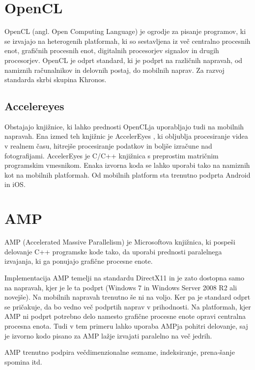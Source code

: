 \section{OpenCL}

OpenCL (angl. Open Computing Language) \cite{opencl} je ogrodje za pisanje programov, ki se izvajajo na heterogenih platformah, ki so sestavljena iz več centralno procesnih enot, grafičnih procesnih enot, digitalnih procesorjev signalov in drugih procesorjev. OpenCL je odprt standard, ki je podprt na različnih napravah, od namiznih računalnikov in delovnih postaj, do mobilnih naprav. Za razvoj standarda skrbi skupina Khronos.

\subsection{Accelereyes}

Obstajajo knjižnice, ki lahko prednosti OpenCLja uporabljajo tudi na mobilnih napravah. Ena izmed teh knjižnic je AccelerEyes \cite{accelereyes}, ki obljublja procesiranje videa v realnem času, hitrejše procesiranje podatkov in boljše izračune nad fotografijami. AccelerEyes je C/C++ knjižnica s preprostim matričnim programskim vmesnikom. Enaka izvorna koda se lahko uporabi tako na namiznih kot na mobilnih platformah. Od mobilnih platform sta trenutno podprta Android in iOS.

\section{AMP}

AMP (Accelerated Massive Parallelism) je Microsoftova knjižnica, ki pospeši delovanje C++ programske kode tako, da uporabi prednosti paralelnega izvajanja, ki ga ponujajo grafične procesne enote. 

Implementacija AMP temelji na standardu DirectX11 in je zato dostopna samo na napravah, kjer je le ta podprt (Windows 7 in Windows Server 2008 R2 ali novejše). Na mobilnih napravah trenutno še ni na voljo. Ker pa je standard odprt se pričakuje, da bo vedno več podprtih naprav v prihodnosti. Na platformah, kjer AMP ni podprt potrebno delo namesto grafične procesne enote opravi centralna procesna enota. Tudi v tem primeru lahko uporaba AMPja pohitri delovanje, saj je izvorno kodo pisano za AMP lažje izvajati paralelno na več jedrih.

AMP trenutno podpira večdimenzionalne sezname, indeksiranje, prena-šanje spomina itd.

